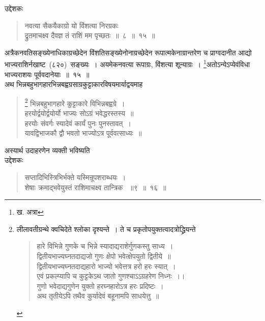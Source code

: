 \documentclass[11pt, openany]{book}
\begin{document}
उद्देशकः\textendash 
\begin{quote}
{\ku
नवत्या सैकयैकाग्रो यो विंशत्या निरग्रकः~\\
द्रुतमाचक्ष्व दैवज्ञ तं राशिं मम पृच्छतः~॥~८~॥~१५~॥}\\
\end{quote}
अत्रैकनवतिसङ्ख्येनाधिकाग्रच्छेदेन विंशतिसङ्ख्येनोनाग्रच्छेदेन रूपात्मकेनाग्रान्तरेण च प्राग्वदानीत आद्यो भाज्यराशिर्नखाष्ट~(८२०)~सङ्ख्यः~। अयमेकनवत्या रूपाग्रः, विंशत्या शून्याग्रः~। \renewcommand\thefootnote{१}\footnote{ख. अत्रा}अतोऽन्येऽप्येवंविधा भाज्यराशयः पूर्ववदानेयाः~॥~१५~॥\\
अथ भिन्नबहुभागहारभिन्नबह्वग्रसाग्रकुट्टाकारविषयमार्याद्वयमाह \textendash\\
\begin{quote}
\renewcommand\thefootnote{*}\footnote{लीलावतीग्रन्थे क्वचिदेते श्लोका दृश्यन्ते~। ते च प्रकृतोपयुक्तत्वादत्रोद्ध्रियन्ते\textendash\\
\begin{quote}
\qt हारे विभिन्ने गुणके च भिन्ने स्यादाद्यराशेर्गुणकस्तु साध्य~।\\
द्वितीयभाज्यघ्नतदाद्यजो गुणः क्षेपो भवेत्क्षेपयुतो द्वितीये~॥\\
द्वितीयभाज्यघ्नतदाद्यहारो भाज्यो भवेत्तत्र हरो हरः स्यात्~।\\
एवं प्रकल्प्यापि च कुट्टकेऽथ जातो गुणश्चाऽऽग्रहरेण निध्नः~।।\\
गुणो भवेदाद्यगुणेन युक्तो हरघ्नहारोऽत्र हरः प्रदिष्टः~।\\
अथ तृतीयेऽपि तथैव कुर्यादेवं बहूनामपि साधयेत्तु~॥\\
\end{quote}}
\qt भिन्नबहुभागहारे कुट्टाकारे विभिन्नबह्वग्रे~।\\
हरयोर्द्वयोर्द्वयोर्यो भाज्यः सोऽग्रं भवेद्धरस्तस्य~॥\\
हरयोः संवर्गः स्यादेवं कार्यं पुनः पुनस्तावत्~।\\
यावद्विभाजकौ द्वौ भवतो भाज्योऽत्र पूर्ववत्साध्यः~॥\\
\end{quote}
अस्यार्थ उदाहरणेन व्यक्ती भविष्यति\textendash \\

उद्देशकः\textendash 
\begin{quote}
{\ku सप्तादिभिस्त्रिभिर्भक्ते यस्मिन्रूपशराब्धयः~।\\
शेषाः क्रमाद्भवेयुस्तं राशिमाचक्ष्व तान्त्रिक ~॥९~॥~१६~॥}
\end{quote}


\newpage
\thispagestyle{fancy}
\fancyhf{}
\end{document}
